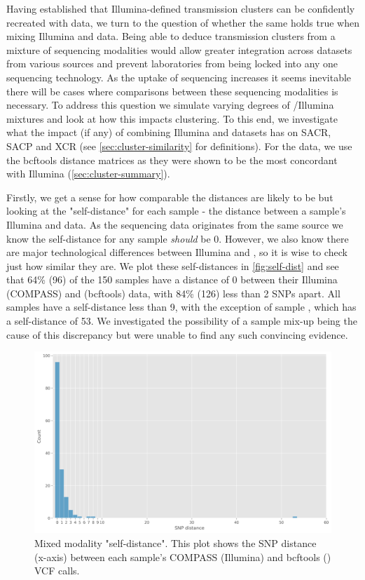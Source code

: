 Having established that Illumina-defined transmission clusters can be
confidently recreated with \ont{} data, we turn to the question of whether the same holds true when mixing Illumina and
\ont{} data. Being able to deduce transmission clusters from a mixture of sequencing
modalities would allow greater integration across datasets from various
sources and prevent laboratories from being locked into any one
sequencing technology. As the uptake of \ont{} sequencing increases it seems
inevitable there will be cases where comparisons between these
sequencing modalities is necessary. To address this question we simulate
varying degrees of \ont{}/Illumina mixtures and look at how this impacts
clustering. To this end, we investigate what the impact (if any) of combining
Illumina and \ont{} datasets has on SACR, SACP and XCR (see \autoref{sec:cluster-similarity} for definitions). For the \ont{} data, we use the bcftools distance matrices as they were shown to be the most concordant with Illumina (\autoref{sec:cluster-summary}).

Firstly, we get a sense for how comparable the distances are likely to
be but looking at the "self-distance" for each sample - the distance
between a sample's Illumina and \ont{} data. 
As the sequencing data originates from the same source we
know the self-distance for any sample \emph{should} be 0. However, we
also know there are major technological differences between Illumina and
\ont{}, so it is wise to check just how similar they are.
We plot these self-distances in \autoref{fig:self-dist} and see that 64\% (96) of the 150 samples have a distance of 0 between their Illumina (COMPASS) and \ont{} (bcftools) data, with 84\% (126) less than 2 SNPs apart. All samples have a self-distance less than 9, with the exception of sample , which has a self-distance of 53. We investigated the possibility of a sample mix-up being the cause of this discrepancy but were unable to find any such convincing evidence. 

\begin{figure}
\begin{center}
\includegraphics[width=0.90\columnwidth]{Chapter2/Figs/mixed_self_dist.png}
\caption{{Mixed modality "self-distance". This plot shows the SNP distance
(x-axis) between each sample's COMPASS (Illumina) and bcftools
(\ont{}) VCF calls.
{\label{fig:self-dist}}%
}}
\end{center}
\end{figure}


